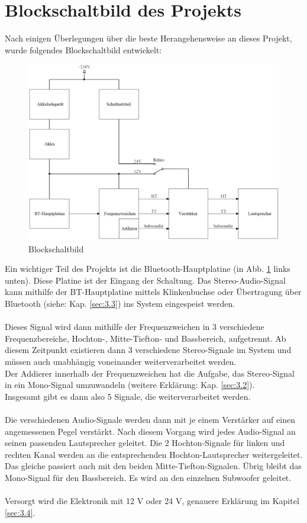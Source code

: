 \section{Blockschaltbild des Projekts}\label{sec:3.1}
Nach einigen Überlegungen über die beste Herangehensweise an dieses Projekt, wurde folgendes Blockschaltbild entwickelt:
\begin{figure} [H]
	\centering
	\includegraphics[width=1\textwidth]{img/blockschaltbild.png}
	\caption{Blockschaltbild}
	\label{fig:3.1.1}
\end{figure}
Ein wichtiger Teil des Projekts ist die Bluetooth-Hauptplatine (in Abb. \ref{fig:3.1.1} links unten).
Diese Platine ist der Eingang der Schaltung.
Das Stereo-Audio-Signal kann mithilfe der BT-Hauptplatine mittels Klinkenbuchse oder Übertragung über Bluetooth (siehe: Kap. \ref{sec:3.3}) ins System eingespeist werden.
\\ \\
Dieses Signal wird dann mithilfe der Frequenzweichen in 3 verschiedene Frequenzbereiche, Hochton-, Mitte-Tiefton- und Bassbereich, aufgetrennt.
Ab diesem Zeitpunkt existieren dann 3 verschiedene Stereo-Signale im System und müssen auch unabhängig voneinander weiterverarbeitet werden.
\\
Der Addierer innerhalb der Frequenzweichen hat die Aufgabe, das Stereo-Signal in ein Mono-Signal umzuwandeln (weitere Erklärung: Kap. \ref{sec:3.2}).
\\
Insgesamt gibt es dann also 5 Signale, die weiterverarbeitet werden.
\\ \\

Die verschiedenen Audio-Signale werden dann mit je einem Verstärker auf einen angemessenen Pegel verstärkt.
Nach diesem Vorgang wird jedes Audio-Signal an seinen passenden Lautsprecher geleitet.
Die 2 Hochton-Signale für linken und rechten Kanal werden an die entsprechenden Hochton-Lautsprecher weitergeleitet.
Das gleiche passiert auch mit den beiden Mitte-Tiefton-Signalen.
Übrig bleibt das Mono-Signal für den Bassbereich.
Es wird an den einzelnen Subwoofer geleitet.
\\ \\
Versorgt wird die Elektronik mit 12 V oder 24 V, genauere Erklärung im Kapitel \ref{sec:3.4}.

